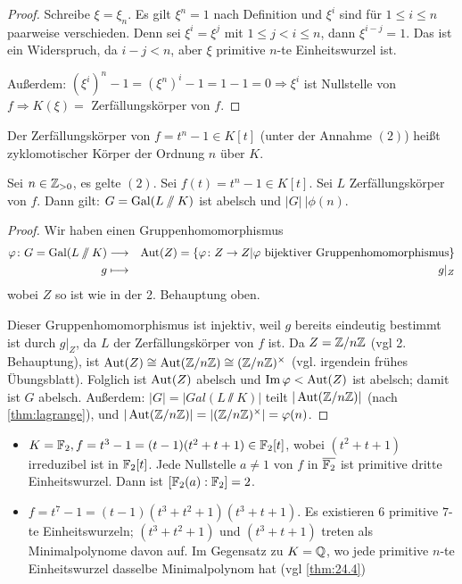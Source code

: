 \documentclass[12pt,a4paper]{scrartcl}
\begin{document}
\begin{proof}
	Schreibe $\xi  = \xi_n$. Es gilt $\xi^n = 1$ nach Definition und $\xi^i$ sind für $1\leq i \leq n$ paarweise verschieden. Denn sei $\xi^i = \xi^j$ mit $1\leq j<i\leq n$, dann $\xi^{i-j} = 1$. Das ist ein Widerspruch, da $i-j<n$, aber $\xi$ primitive $n$-te Einheitswurzel ist.
	
	Außerdem: $(\xi^i)^n-1 = (\xi^n)^i-1 = 1-1 = 0\Rightarrow \xi^i$ ist Nullstelle von $f \Rightarrow K(\xi) =$ Zerfällungskörper von $f$.
\end{proof}
\begin{defi}
	Der Zerfällungskörper von $f = t^n-1\in K[t]$ (unter der Annahme $(2)$) heißt zyklomotischer Körper der Ordnung $n$ über $K$.
\end{defi}
\begin{lem}\label{lem:24.2}
	Sei $n\in \mathbb Z_{>0}$, es gelte $(2)$. Sei $f(t) = t^n-1\in K[t]$. Sei $L$ Zerfällungskörper von $f$. Dann gilt: $G = \operatorname{Gal}(L\sslash K)$ ist abelsch und $|G|\ |\phi(n)$.
\end{lem}
\begin{proof}
	Wir haben einen Gruppenhomomorphismus
	\begin{eqnarray*}
		\varphi\colon G = \operatorname{Gal}(L\sslash K) & \longrightarrow & \operatorname{Aut}(Z) =\{\varphi\colon Z\to Z|\varphi\text{ bijektiver Gruppenhomomorphismus}\}\\
		g & \longmapsto & g|_Z
	\end{eqnarray*}
	wobei $Z$ so ist wie in der 2. Behauptung oben.
	
	Dieser Gruppenhomomorphismus ist injektiv, weil $g$ bereits eindeutig bestimmt ist durch $g|_Z$, da $L$ der Zerfällungskörper von $f$ ist. Da $Z = \mathbb Z/n\mathbb Z$ (vgl 2. Behauptung), ist $\operatorname{Aut}(Z) \cong \operatorname{Aut}(\mathbb Z/n\mathbb Z)\cong(\mathbb Z/n\mathbb Z)^{\times}$ (vgl. irgendein frühes Übungsblatt). Folglich ist $\operatorname{Aut} (Z)$ abelsch und $\operatorname{Im}\varphi<\operatorname{Aut}(Z)$ ist abelsch; damit ist $G$ abelsch. Außerdem: $|G| = |Gal(L\sslash K)|$ teilt $|\operatorname{Aut}(\mathbb Z/n\mathbb Z)|$ (nach \ref{thm:lagrange}), und $|\operatorname{Aut}(\mathbb Z/n\mathbb Z)| = |(\mathbb Z/n\mathbb Z)^{\times}| = \varphi(n)$.
\end{proof}
\begin{bsp}
	\leavevmode
	\begin{itemize}
	\item $K = \mathbb F_2, f = t^3-1 = (t-1)(t^2+t+1)\in\mathbb F_2[t]$, wobei $(t^2+t+1)$ irreduzibel ist in $\mathbb F_2[t]$. Jede Nullstelle $a\neq 1$ von $f$ in $\overline{\mathbb F_2}$ ist primitive dritte Einheitswurzel. Dann ist $[\mathbb F_2(a):\mathbb F_2] = 2$.
	\item $f = t^7-1 = (t-1)(t^3+t^2+1)(t^3+t+1)$. Es existieren $6$ primitive $7$-te Einheitswurzeln; $(t^3+t^2+1)$ und $(t^3+t+1)$ treten als Minimalpolynome davon auf. Im Gegensatz zu $K = \mathbb Q$, wo jede primitive $n$-te Einheitswurzel dasselbe Minimalpolynom hat (vgl \ref{thm:24.4})
	\end{itemize}
\end{bsp}
\end{document}
